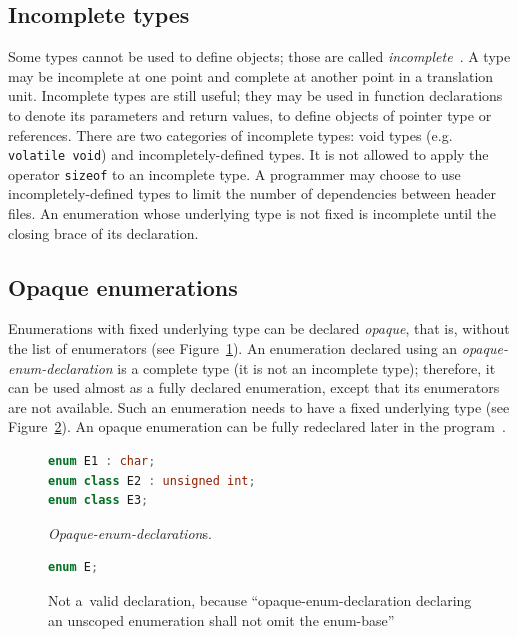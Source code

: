 \documentclass[nolot,nolof,nocover,printed]{fithesis3}
\newcommand{\stdN}[2]{\cite[#2]{#1}\xspace}
\begin{document}
\subsection{Incomplete types}
Some types cannot be used to define objects; those are called \textit{incomplete}~\stdN{n4296}{\S 3.1/5}. A type may be incomplete at one point and complete at another point in a translation unit. Incomplete types are still useful; they may be used in function declarations to denote its parameters and return values, to define objects of pointer type or references. There are two categories of incomplete types: void types (e.g. \texttt{volatile void}) and incompletely-defined types. It is not allowed to apply the operator \texttt{sizeof} to an incomplete type. A programmer may choose to use incompletely-defined types to limit the number of dependencies between header files. An enumeration whose underlying type is not fixed is incomplete until the closing brace of its declaration.

\subsection{Opaque enumerations}

Enumerations with fixed underlying type can be declared \textit{opaque}, that is, without the list of enumerators (see Figure~\ref{fig:opaqueEnumDeclarations}). An enumeration declared using an \textit{opaque-enum-declaration} is a complete type (it is not an incomplete type); therefore, it can be used almost as a fully declared enumeration, except that its enumerators are not available. Such an enumeration needs to have a fixed underlying type (see Figure~\ref{fig:opaqueEnumNotFixedUT}). An opaque enumeration can be fully redeclared later in the program~\stdN{n4296}{\S 7.2/3}.

\begin{figure}
\begin{lstlisting}[language=C++]
enum E1 : char;
enum class E2 : unsigned int;
enum class E3;
\end{lstlisting}
\caption{\textit{Opaque-enum-declaration}s.}
\label{fig:opaqueEnumDeclarations}
\end{figure}

\begin{figure}
\begin{lstlisting}[language=C++]
enum E;
\end{lstlisting}
\caption{Not a~valid declaration, because \enquote{opaque-enum-declaration declaring an unscoped enumeration shall not omit the enum-base}~\stdN{n4296}{\S 7.2/2}}
\label{fig:opaqueEnumNotFixedUT}
\end{figure}
\end{document}
